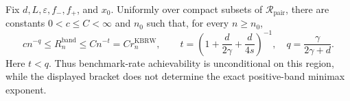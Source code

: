 Fix \(d,L,\varepsilon,f_-,f_+\), and \(x_0\).  Uniformly over compact
subsets of \(\mathcal R_{\mathrm{pair}}\), there are constants
\(0<c\leq C<\infty\) and \(n_0\) such that, for every \(n\geq n_0\),
\[
c n^{-q}\leq R_n^{\mathrm{band}}
\leq C n^{-t}=C r_n^{\mathrm{KBRW}},
\qquad
t=\left(1+\frac d{2\gamma}+\frac d{4s}\right)^{-1},
\quad q=\frac\gamma{2\gamma+d}.
\]
Here \(t<q\).  Thus benchmark-rate achievability is unconditional on this
region, while the displayed bracket does not determine the exact positive-band
minimax exponent.